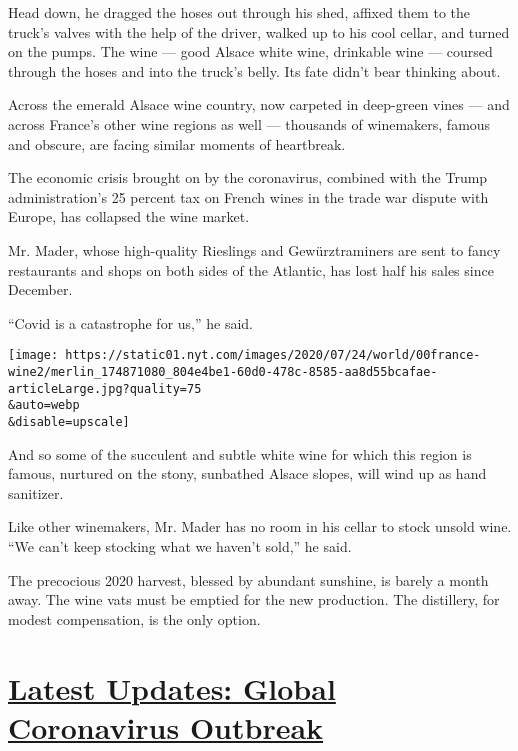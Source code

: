 Head down, he dragged the hoses out through his shed, affixed them to
the truck's valves with the help of the driver, walked up to his cool
cellar, and turned on the pumps. The wine --- good Alsace white wine,
drinkable wine --- coursed through the hoses and into the truck's belly.
Its fate didn't bear thinking about.

Across the emerald Alsace wine country, now carpeted in deep-green vines
--- and across France's other wine regions as well --- thousands of
winemakers, famous and obscure, are facing similar moments of
heartbreak.

The economic crisis brought on by the coronavirus, combined with the
Trump administration's 25 percent tax on French wines in the trade war
dispute with Europe, has collapsed the wine market.

Mr. Mader, whose high-quality Rieslings and Gewürztraminers are sent to
fancy restaurants and shops on both sides of the Atlantic, has lost half
his sales since December.

``Covid is a catastrophe for us,'' he said.

\texttt{[image: https://static01.nyt.com/images/2020/07/24/world/00france-wine2/merlin\_174871080\_804e4be1-60d0-478c-8585-aa8d55bcafae-articleLarge.jpg?quality=75\\\&auto=webp\\\&disable=upscale]}

And so some of the succulent and subtle white wine for which this region
is famous, nurtured on the stony, sunbathed Alsace slopes, will wind up
as hand sanitizer.

Like other winemakers, Mr. Mader has no room in his cellar to stock
unsold wine. ``We can't keep stocking what we haven't sold,'' he said.

The precocious 2020 harvest, blessed by abundant sunshine, is barely a
month away. The wine vats must be emptied for the new production. The
distillery, for modest compensation, is the only option.

\hypertarget{latest-updates-global-coronavirus-outbreak}{%
\section{\texorpdfstring{\href{https://www.nytimes.com/2020/08/04/world/coronavirus-cases.html?action=click\&pgtype=Article\&state=default\&region=MAIN_CONTENT_1\&context=storylines_live_updates}{Latest
Updates: Global Coronavirus
Outbreak}}{Latest Updates: Global Coronavirus Outbreak}}\label{latest-updates-global-coronavirus-outbreak}}


